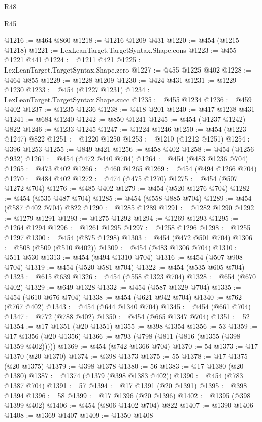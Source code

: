 \begin{lexlean}{R48}
\begin{lexlean}{R45}
\begin{coremodule}
{{{{{{{{{{{{{{{{{{{{{{{{{{{{{{{{{{{{{{{{{{{{{{{{{{{{{{{{{{{{{{{{{{{{{{{{{{{{{{{{{{{{{{{{{{{@1216 := @464 @860
@1218 := @1216 @1209 @431
@1220 := @454 (@1215 @1218)
@1221 := LexLeanTarget.TargetSyntax.Shape.cons
@1223 := @455 @1221 @441
@1224 := @1211 @421
@1225 := LexLeanTarget.TargetSyntax.Shape.zero
@1227 := @455 @1225 @402
@1228 := @464 @855
@1229 := @1228 @1209
@1230 := @424 @431
@1231 := @1229 @1230
@1233 := @454 (@1227 @1231)
@1234 := LexLeanTarget.TargetSyntax.Shape.succ
@1235 := @455 @1234
@1236 := @459 @402
@1237 := @1235 @1236
@1238 := @418 @201
@1240 := @417 @1238 @431
@1241 := @684 @1240
@1242 := @850 @1241
@1245 := @454 (@1237 @1242) @822
@1246 := @1233 @1245
@1247 := @1224 @1246
@1250 := @454 (@1223 @1247) @822
@1251 := @1220 @1250
@1253 := @1210 (@1212 @1251)
@1254 := @396 @1253
@1255 := @849 @421
@1256 := @458 @402
@1258 := @454 (@1256 @932)
@1261 := @454 (@472 @440 @704)
@1264 := @454 (@483 @1236 @704)
@1265 := @473 @402
@1266 := @460 @1265
@1269 := @454 (@494 @1266 @704)
@1270 := @484 @402
@1272 := @474 (@475 @1270)
@1275 := @454 (@507 @1272 @704)
@1276 := @485 @402
@1279 := @454 (@520 @1276 @704)
@1282 := @454 (@535 @487 @704)
@1285 := @454 (@558 @885 @704)
@1289 := @454 (@587 @402 @704) @822
@1290 := @1285 @1289
@1291 := @1282 @1290
@1292 := @1279 @1291
@1293 := @1275 @1292
@1294 := @1269 @1293
@1295 := @1264 @1294
@1296 := @1261 @1295
@1297 := @1258 @1296
@1298 := @1255 @1297
@1300 := @454 (@875 @1298)
@1303 := @454 (@472 @501 @704)
@1306 := @508 (@509 (@510 @402))
@1309 := @454 (@483 @1306 @704)
@1310 := @511 @530
@1313 := @454 (@494 @1310 @704)
@1316 := @454 (@507 @908 @704)
@1319 := @454 (@520 @581 @704)
@1322 := @454 (@535 @605 @704)
@1323 := @615 @639
@1326 := @454 (@558 @1323 @704)
@1328 := @654 (@670 @402)
@1329 := @649 @1328
@1332 := @454 (@587 @1329 @704)
@1335 := @454 (@610 @676 @704)
@1338 := @454 (@621 @942 @704)
@1340 := @762 (@767 @402)
@1343 := @454 (@644 @1340 @704)
@1345 := @454 (@661 @704)
@1347 := @772 (@788 @402)
@1350 := @454 (@665 @1347 @704)
@1351 := 52
@1354 := @17 @1351 (@20 @1351)
@1355 := @398 @1354
@1356 := 53
@1359 := @17 @1356 (@20 @1356)
@1366 := @793 (@798 (@811 (@816 (@1355 (@398 @1359 @402)))))
@1369 := @454 (@742 @1366 @704)
@1370 := 54
@1373 := @17 @1370 (@20 @1370)
@1374 := @398 @1373
@1375 := 55
@1378 := @17 @1375 (@20 @1375)
@1379 := @398 @1378
@1380 := 56
@1383 := @17 @1380 (@20 @1380)
@1387 := @1374 (@1379 (@398 @1383 @402))
@1390 := @454 (@783 @1387 @704)
@1391 := 57
@1394 := @17 @1391 (@20 @1391)
@1395 := @398 @1394
@1396 := 58
@1399 := @17 @1396 (@20 @1396)
@1402 := @1395 (@398 @1399 @402)
@1406 := @454 (@806 @1402 @704) @822
@1407 := @1390 @1406
@1408 := @1369 @1407
@1409 := @1350 @1408
}}}}}}}}}}}}}}}}}}}}}}}}}}}}}}}}}}}}}}}}}}}}}}}}}}}}}}}}}}}}}}}}}}}}}}}}}}}}}}}}}}}}}}}}}}}
\end{coremodule}
\end{lexlean}
\end{lexlean}
